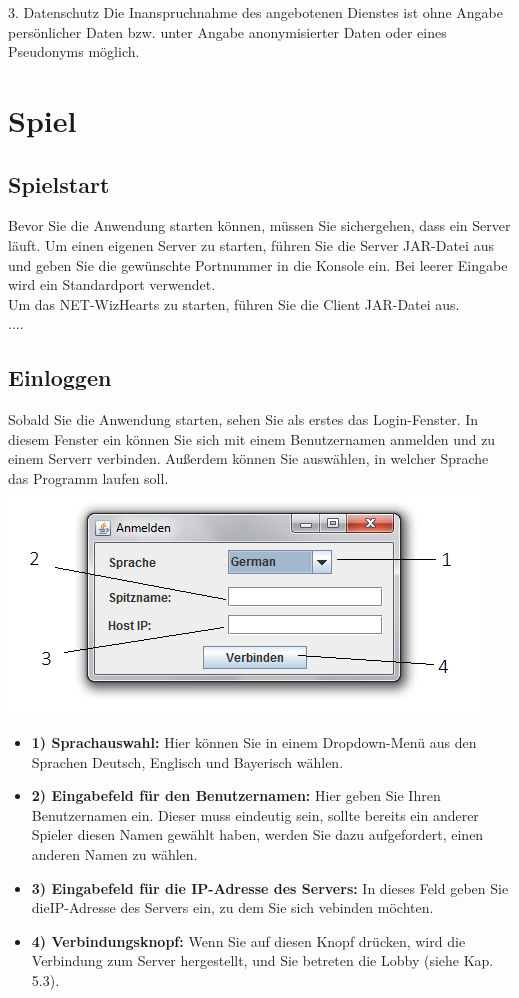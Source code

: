 \documentclass[titlepage,10pt,a4paper]{article}
\begin{document}
3. Datenschutz
Die Inanspruchnahme des angebotenen Dienstes ist ohne Angabe persönlicher Daten bzw. unter Angabe anonymisierter Daten oder eines Pseudonyms möglich.
\\

\section{Spiel}
\subsection{Spielstart}
Bevor Sie die Anwendung starten können, müssen Sie sichergehen, dass ein \gls{Server} läuft. Um einen eigenen \gls{Server} zu starten, führen Sie die \gls{Server} JAR-Datei aus und geben Sie die gewünschte Portnummer in die Konsole ein. Bei leerer Eingabe wird ein Standardport verwendet.\\
Um das NET-WizHearts zu starten, führen Sie die Client JAR-Datei aus.\\
....\\
\subsection{Einloggen}
Sobald Sie die Anwendung starten, sehen Sie als erstes das Login-Fenster. In diesem Fenster ein können Sie sich mit einem Benutzernamen anmelden und zu einem \gls{Server}r verbinden. Außerdem können Sie auswählen, in welcher Sprache das Programm laufen soll.\\
\includegraphics[width=\textwidth]{Login-Fenster}
\begin{itemize}
	\item \textbf{1) Sprachauswahl:} Hier können Sie in einem Dropdown-Menü aus den Sprachen Deutsch, Englisch und Bayerisch wählen.
	\item \textbf{2) Eingabefeld für den Benutzernamen:} Hier geben Sie Ihren Benutzernamen ein. Dieser muss eindeutig sein, sollte bereits ein anderer Spieler diesen Namen gewählt haben, werden Sie dazu aufgefordert, einen anderen Namen zu wählen.
	\item \textbf{3) Eingabefeld für die \gls{IP-Adresse} des \gls{Server}s:} In dieses Feld geben Sie die\gls{IP-Adresse} des \gls{Server}s ein, zu dem Sie sich vebinden möchten.
	\item \textbf{4) Verbindungsknopf:} Wenn Sie auf diesen Knopf drücken, wird die Verbindung zum \gls{Server} hergestellt, und Sie betreten die \gls{Lobby} (siehe Kap. 5.3).
\end{itemize}
\end{document}
